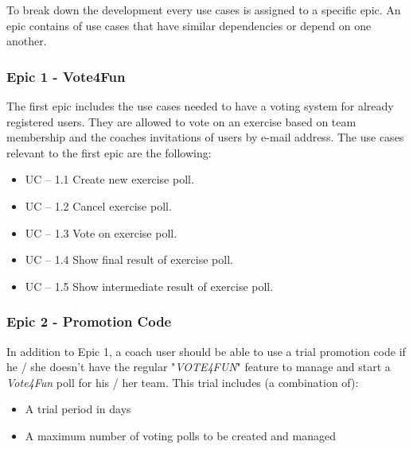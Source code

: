 To break down the development every use cases is assigned to a specific epic. An epic contains of use cases that have similar dependencies or depend on one another.

\subsubsection{Epic 1 - Vote4Fun}
\label{sssec:epic1}

The first epic includes the use cases needed to have a voting system for already registered users. They are allowed to vote on an exercise based on team membership and the coaches invitations of users by e-mail address.
\newline
The use cases relevant to the first epic are the following:

\begin{itemize}
    \item UC – 1.1 
    \newline
    Create new exercise poll.
    \item UC – 1.2 
    \newline
    Cancel exercise poll.
    \item UC – 1.3 
    \newline
    Vote on exercise poll.
    \item UC – 1.4 
    \newline
    Show final result of exercise poll.
    \item UC – 1.5 
    \newline
    Show intermediate result of exercise poll.
\end{itemize}

\subsubsection{Epic 2 - Promotion Code}
\label{sssec:epic2}

In addition to Epic 1, a coach user should be able to use a trial promotion code if he / she doesn't have the regular "\textit{VOTE4FUN}" feature to manage and start a \textit{Vote4Fun} poll for his / her team. 
\newline
This trial includes (a combination of):

\begin{itemize}
    \item A trial period in days
    \item A  maximum number of  voting polls to be created and managed
\end{itemize}

